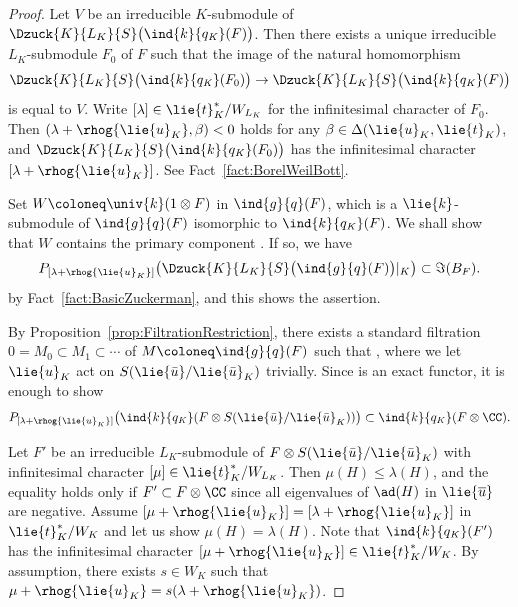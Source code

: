 \begin{proof}
	Let $V$ be an irreducible $K$-submodule of $\Dzuck{K}{L_K}{S}\bigl(\ind{k}{q_\mathit{K}}(F)\bigr)$.
	Then there exists a unique irreducible $L_K$-submodule $F_0$ of $F$ such that
	the image of the natural homomorphism
	\begin{align*}
		\Dzuck{K}{L_K}{S}\bigl(\ind{k}{q_\mathit{K}}(F_0)\bigr) \rightarrow \Dzuck{K}{L_K}{S}\bigl(\ind{k}{q_\mathit{K}}(F)\bigr)
	\end{align*}
	is equal to $V$.
	Write $[\lambda] \in \lie{t}^*_K / W_{L_K}$ for the infinitesimal character of $F_0$.
	Then $(\lambda + \rhog{\lie{u}_K}, \beta) < 0$ holds for any $\beta \in \Delta(\lie{u}_K, \lie{t}_K)$,
	and $\Dzuck{K}{L_K}{S}\bigl(\ind{k}{q_\mathit{K}}(F_0)\bigr)$ has the infinitesimal character $[\lambda+\rhog{\lie{u}_K}]$.
	See Fact~\ref{fact:BorelWeilBott}.

	Set $W\coloneq\univ{k}(1\otimes F)$ in $\ind{g}{q}(F)$, which
	is a $\lie{k}$-submodule of $\ind{g}{q}(F)$ isomorphic to $\ind{k}{q_\mathit{K}}(F)$.
	We shall show that $W$ contains the primary component .
	If so, we have
	\begin{align*}
		P_{[\lambda + \rhog{\lie{u}_K}]}\bigl(\Dzuck{K}{L_K}{S}\bigl(\ind{g}{q}(F)\bigr)|_K\bigr) \subset \Im(B_F).
	\end{align*}
	by Fact~\ref{fact:BasicZuckerman}, and this shows the assertion.

	By Proposition~\ref{prop:FiltrationRestriction}, there exists a standard filtration
	$0 = M_0 \subset M_1 \subset \cdots$ of $M \coloneq \ind{g}{q}(F)$ such that
	,
	where we let $\lie{u}_K$ act on $S(\lie{\bar{u}}/\lie{\bar{u}}_K)$ trivially.
	Since  is an exact functor,
	it is enough to show
	\begin{align*}
		P_{[\lambda + \rhog{\lie{u}_K}]}\bigl(\ind{k}{q_\mathit{K}}(F\otimes S(\lie{\bar{u}}/\lie{\bar{u}}_K))\bigr)
		\subset \ind{k}{q_\mathit{K}}(F\otimes \CC).
	\end{align*}

	Let $F'$ be an irreducible $L_K$-submodule of $F\otimes S(\lie{\bar{u}}/\lie{\bar{u}}_K)$ with infinitesimal character $[\mu] \in \lie{t}_K^*/W_{L_K}$.
	Then $\mu(H) \leq \lambda(H)$, and the equality holds only if $F'\subset F\otimes \CC$ since all eigenvalues of $\ad(H)$ in $\lie{\overline{u}}$ are negative.
	Assume $[\mu + \rhog{\lie{u}_K}] = [\lambda+\rhog{\lie{u}_K}]$ in $\lie{t}_K^*/W_K$ and let us show $\mu(H) = \lambda(H)$.
	Note that $\ind{k}{q_\mathit{K}}(F')$ has the infinitesimal character $[\mu + \rhog{\lie{u}_K}] \in \lie{t}_K^*/W_K$.
	By assumption, there exists $s \in W_K$ such that $\mu + \rhog{\lie{u}_K} = s(\lambda+\rhog{\lie{u}_K})$.


\end{proof}
